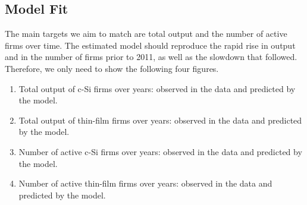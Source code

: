 \documentclass[12pt]{article}
\begin{document}
\newpage
\subsection{Model Fit}

The main targets we aim to match are total output and the number of active firms over time. The estimated model should reproduce the rapid rise in output and in the number of firms prior to 2011, as well as the slowdown that followed. Therefore, we only need to show the following four figures. 
\begin{enumerate}
    \item Total output of c-Si firms over years: observed in the data and predicted by the model.
    \item Total output of thin-film firms over years: observed in the data and predicted by the model.
    \item Number of active c-Si firms over years: observed in the data and predicted by the model.
    \item Number of active thin-film firms over years: observed in the data and predicted by the model.
\end{enumerate}
\end{document}
